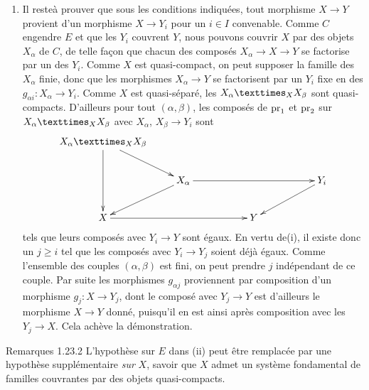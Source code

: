\documentclass[10pt]{../fichiers-configuration-latex/smfart}
\begin{document}
\begin{enumerate}
\item Il reste\pageoriginale à prouver que sous les conditions indiquées, tout
  morphisme $X \to Y$ provient d'un morphisme $X \to Y_i$ pour un $i
  \in I$ convenable. Comme $C$ engendre $E$ et que les $Y_i$ couvrent
  $Y$, nous pouvons couvrir $X$ par des objets $X_{\alpha}$ de $C$, de
  telle façon que chacun des composés $X_{\alpha} \to X \to Y$ se
  factorise par un des $Y_i$. Comme $X$ est quasi-compact, on peut
  supposer la famille des $X_{\alpha}$ finie, donc que les morphismes
  $X_{\alpha} \to Y$ se factorisent par un $Y_i$ fixe en des
  $g_{\alpha i} : X_{\alpha} \to Y_i$. Comme $X$ est quasi-séparé, les
  $\fprod{X_{\alpha}}{X_{\beta}}{X}$ sont quasi-compacts. D'ailleurs
  pour tout $(\alpha, \beta)$, les composés de $\operatorname{pr}_1$ et $\operatorname{pr}_2$ sur
  $\fprod{X_{\alpha}}{X_{\beta}}{X}$ avec $X_{\alpha}$, $X_{\beta} \to
  Y_i$ sont
\[
\xymatrix{
\fprod{X_{\alpha}}{X_{\beta}}{X} \ar[rd] \ar[dd]& &\\
                            &X_{\alpha} \ar[ld] \ar[rrrr]&   & & & Y_i
\ar[lld]\\
X    \ar[rrr]                       &          & & Y  &
}
\]
tels que leurs composés avec $Y_i \to Y$ sont égaux. En
  vertu de(i), il existe donc un $j \geq i$ tel que les composés avec
  $Y_i \to Y_j$ soient déjà égaux. Comme l'ensemble des couples
  $(\alpha, \beta)$ est fini, on peut prendre $j$ indépendant de ce
  couple. Par suite les morphismes $g_{\alpha j}$ proviennent par
  composition d'un morphisme $g_j : X \to Y_j$, dont le composé avec
  $Y_j \to Y$ est d'ailleurs le morphisme $X \to Y$ donné, puisqu'il
  en est ainsi après composition avec les $Y_j \to X$. Cela achève la
  démonstration.
\end{enumerate}

\begin{enonce*}[remark]{Remarques 1.23.2}
L'hypothèse sur $E$ dans (ii) peut être remplacée par une hypothèse
supplémentaire \emph{sur} $X$, savoir que $X$ admet un système fondamental de
familles couvrantes par des objets quasi-compacts.
\end{enonce*}
\end{document}
